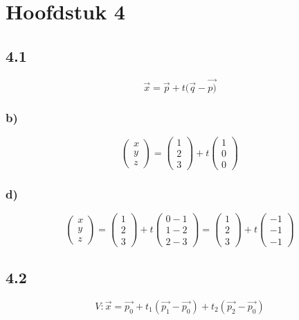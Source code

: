 \documentclass[11pt]{article}
\begin{document}
\section*{Hoofdstuk 4}
\subsection*{4.1}
\[
\vec{x}=\vec{p}+t(\vec{q}-\vec{p)}
\]
\subsubsection*{b)}
\[
\begin{pmatrix}
x\\y\\z
\end{pmatrix}
=
\begin{pmatrix}
1\\2\\3
\end{pmatrix}
+t
\begin{pmatrix}
1\\0\\0
\end{pmatrix}
\]
\subsubsection*{d)}
\[
\begin{pmatrix}
x\\y\\z
\end{pmatrix}
=
\begin{pmatrix}
1\\2\\3
\end{pmatrix}
+t
\begin{pmatrix}
0-1\\1-2\\2-3
\end{pmatrix}
=
\begin{pmatrix}
1\\2\\3
\end{pmatrix}
+t
\begin{pmatrix}
-1\\-1\\-1
\end{pmatrix}
\]

\subsection*{4.2}
\[
V: \vec{x} = \vec{p_0}+t_1(\vec{p_1}-\vec{p_0}) +t_2(\vec{p_2}-\vec{p_0})
\]
\end{document}

